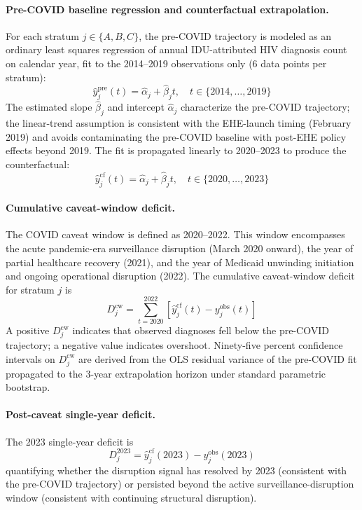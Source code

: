 \documentclass[11pt]{article}
\begin{document}
\paragraph{Pre-COVID baseline regression and counterfactual extrapolation.} For each stratum $j \in \{A, B, C\}$, the pre-COVID trajectory is modeled as an ordinary least squares regression of annual IDU-attributed HIV diagnosis count on calendar year, fit to the 2014--2019 observations only (6 data points per stratum):
\begin{equation}
\hat{y}_j^{\mathrm{pre}}(t) = \hat\alpha_j + \hat\beta_j t, \quad t \in \{2014, \ldots, 2019\}
\end{equation}
The estimated slope $\hat\beta_j$ and intercept $\hat\alpha_j$ characterize the pre-COVID trajectory; the linear-trend assumption is consistent with the EHE-launch timing (February 2019) and avoids contaminating the pre-COVID baseline with post-EHE policy effects beyond 2019. The fit is propagated linearly to 2020--2023 to produce the counterfactual:
\begin{equation}
\hat{y}_j^{\mathrm{cf}}(t) = \hat\alpha_j + \hat\beta_j t, \quad t \in \{2020, \ldots, 2023\}
\end{equation}

\paragraph{Cumulative caveat-window deficit.} The COVID caveat window is defined as 2020--2022. This window encompasses the acute pandemic-era surveillance disruption (March 2020 onward), the year of partial healthcare recovery (2021), and the year of Medicaid unwinding initiation and ongoing operational disruption (2022). The cumulative caveat-window deficit for stratum $j$ is
\begin{equation}
D_j^{\mathrm{cw}} = \sum_{t=2020}^{2022} \left[\hat{y}_j^{\mathrm{cf}}(t) - y_j^{\mathrm{obs}}(t)\right]
\end{equation}
A positive $D_j^{\mathrm{cw}}$ indicates that observed diagnoses fell below the pre-COVID trajectory; a negative value indicates overshoot. Ninety-five percent confidence intervals on $D_j^{\mathrm{cw}}$ are derived from the OLS residual variance of the pre-COVID fit propagated to the 3-year extrapolation horizon under standard parametric bootstrap.

\paragraph{Post-caveat single-year deficit.} The 2023 single-year deficit is
\begin{equation}
D_j^{2023} = \hat{y}_j^{\mathrm{cf}}(2023) - y_j^{\mathrm{obs}}(2023)
\end{equation}
quantifying whether the disruption signal has resolved by 2023 (consistent with the pre-COVID trajectory) or persisted beyond the active surveillance-disruption window (consistent with continuing structural disruption).
\end{document}
